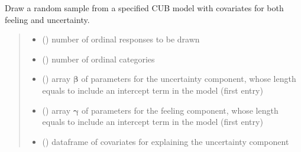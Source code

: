 \documentclass[letterpaper,10pt,english]{sphinxmanual}
\begin{document}
\begin{fulllineitems}
\label{\detokenize{cubmods:cubmods.cub_yw.draw}}
\pysigstartsignatures
{}
\pysigstopsignatures
\sphinxAtStartPar
Draw a random sample from a specified CUB model with covariates for
both feeling and uncertainty.
\begin{quote}\begin{description}
\begin{itemize}
\item {} 
\sphinxAtStartPar
{} () \textendash{} number of ordinal responses to be drawn

\item {} 
\sphinxAtStartPar
{} () \textendash{} number of ordinal categories

\item {} 
\sphinxAtStartPar
{} () \textendash{} array \(\pmb \beta\) of parameters for the uncertainty component, whose length equals 
 to include an intercept term in the model (first entry)

\item {} 
\sphinxAtStartPar
{} () \textendash{} array \(\pmb \gamma\) of parameters for the feeling component, whose length equals 
 to include an intercept term in the model (first entry)

\item {} 
\sphinxAtStartPar
{} () \textendash{} dataframe of covariates for explaining the uncertainty component


\end{itemize}
\end{description}
\end{quote}
\end{fulllineitems}
\end{document}
